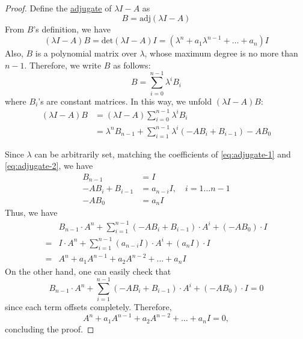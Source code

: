 \documentclass[
]{book}
\theoremstyle{definition}
\theoremstyle{definition}
\theoremstyle{definition}
\theoremstyle{definition}
\theoremstyle{remark}
\begin{document}
\begin{proof}
Define the \href{https://en.wikipedia.org/wiki/Adjugate_matrix}{adjugate} of \(\lambda I - A\) as
\[
   B = \text{adj}(\lambda I - A)
\]
From \(B\)'s definition, we have
\begin{equation}
(\lambda I - A) B  = \text{det}(\lambda I - A) I = (\lambda^n + a_1 \lambda^{n-1} + \dots + a_n) I
\label{eq:adjugate-1}
\end{equation}
Also, \(B\) is a polynomial matrix over \(\lambda\), whose maximum degree is no more than \(n - 1\). Therefore, we write \(B\) as follows:
\[
   B = \sum_{i=0}^{n-1} \lambda^i B_i
\]
where \(B_i\)'s are constant matrices. In this way, we unfold \((\lambda I - A)B\):
\begin{equation}
\label{eq:adjugate-2}
   \begin{split}
      (\lambda I - A) B & = (\lambda I - A) \sum_{i=0}^{n-1} \lambda^i B_i \\
      & = \lambda^n B_{n-1} + \sum_{i=1}^{n-1} \lambda^i (-A B_i + B_{i-1}) - A B_0
   \end{split}
\end{equation}

Since \(\lambda\) can be arbitrarily set, matching the coefficients of \eqref{eq:adjugate-1} and \eqref{eq:adjugate-2}, we have
\begin{equation*}
   \begin{split}
      B_{n-1} & = I \\
      -A B_i + B_{i-1} & = a_{n-i} I, \quad i = 1 \dots n - 1 \\
      -A B_0 & = a_n I
   \end{split}
\end{equation*}
Thus, we have
\begin{equation*}
   \begin{split}
      & B_{n-1} \cdot A^n + \sum_{i=1}^{n-1} (-A B_i + B_{i-1}) \cdot A^i + (-A B_0) \cdot I \\
      = & I \cdot A^n + \sum_{i=1}^{n-1} (a_{n-i} I) \cdot A^i + (a_n I) \cdot I \\
      = & A^n + a_1 A^{n-1} + a_2 A^{n-2} + \dots + a_n I 
   \end{split}
\end{equation*}
On the other hand, one can easily check that
\[
   B_{n-1} \cdot A^n + \sum_{i=1}^{n-1} (-A B_i + B_{i-1}) \cdot A^i + (-A B_0) \cdot I = 0
\]
since each term offsets completely. Therefore,
\[
   A^n + a_1 A^{n-1} + a_2 A^{n-2} + \dots + a_n I = 0,
\]
concluding the proof.
\end{proof}
\end{document}
